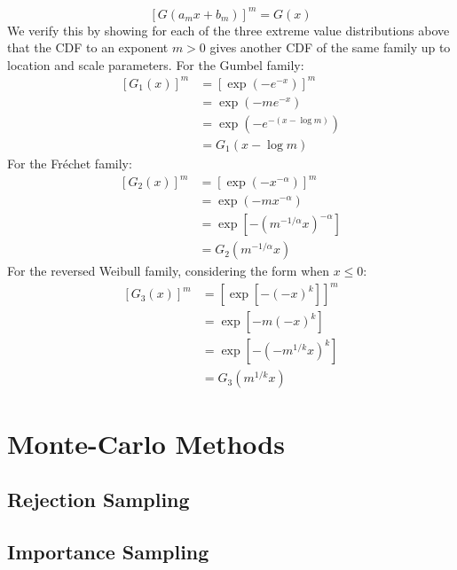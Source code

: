 \documentclass[11pt]{report} %
\begin{document}
\begin{equation}
\left[G\left(a_{m}x + b_{m}\right)\right]^{m} = G\left(x\right)
\end{equation}
We verify this by showing for each of the three extreme value distributions above that the CDF to an exponent $m > 0$ gives another CDF of the same family up to location and scale parameters. For the Gumbel family:
\begin{align}
\left[G_{1}\left(x\right)\right]^{m} &= \left[\exp\left(-e^{-x}\right)\right]^{m} \\
&= \exp\left(-me^{-x}\right) \\
&= \exp\left(-e^{-\left(x - \log m\right)}\right) \\
&= G_{1}\left(x - \log m\right)
\end{align}
For the Fr\'{e}chet family:
\begin{align}
\left[G_{2}\left(x\right)\right]^{m} &= \left[\exp\left(-x^{-\alpha}\right)\right]^{m} \\
&= \exp\left(-mx^{-\alpha}\right) \\
&= \exp\left[-\left(m^{-1/\alpha}x\right)^{-\alpha}\right] \\
&= G_{2}\left(m^{-1/\alpha}x\right)
\end{align}
For the reversed Weibull family, considering the form when $x \leq 0$:
\begin{align}
\left[G_{3}\left(x\right)\right]^{m} &= \left[\exp\left[-\left(-x\right)^{k}\right]\right]^{m} \\
&= \exp\left[-m\left(-x\right)^{k}\right] \\
&= \exp\left[-\left(-m^{1/k}x\right)^{k}\right] \\
&= G_{3}\left(m^{1/k}x\right)
\end{align}



\section{Monte-Carlo Methods}

\subsection{Rejection Sampling}

\subsection{Importance Sampling}
\end{document}

